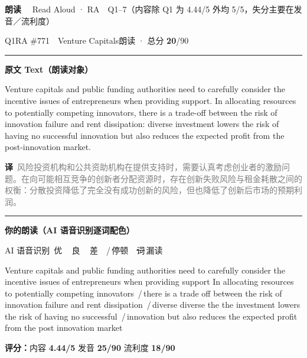 \documentclass[11pt]{article}
\newcommand{\sfull}[1]{\textcolor{cFix}{\bfseries #1}}     %
\newcommand{\spart}[1]{\textcolor{cPartial}{\bfseries #1}} %
\newcommand{\szero}[1]{\textcolor{cWrong}{\bfseries #1}}   %
\newcommand{\ptesub}[1]{%
  \par\needspace{2\baselineskip}\smallskip
  {\color{cAccent}\rule[-0.2ex]{3pt}{1.05em}}\hspace{6pt}%
  {\bfseries\color{cHead}#1}\par\nopagebreak\smallskip}
\newcommand{\ptetask}[2]{%
  \addcontentsline{toc}{subsection}{#1\ #2}%
  \needspace{4\baselineskip}\medskip
  \begin{tcolorbox}[enhanced, colback=cHead, colframe=cHead, sharp corners,
     left=12pt, right=12pt, top=5pt, bottom=5pt, boxrule=0pt]
    {\large\bfseries\color{white} #1}\ \ {\color{white!80} #2}
  \end{tcolorbox}\smallskip}
\newcommand{\sg}[1]{\textcolor{cSpkGood}{#1}}   %
\newcommand{\sy}[1]{\textcolor{cSpkOk}{#1}}     %
\newcommand{\sr}[1]{\textcolor{cSpkBad}{#1}}    %
\newcommand{\pse}{{\color{gray}\,/\,}}          %
\newcommand{\asrlegend}{{\footnotesize\color{gray}AI 语音识别\quad
  {\color{cSpkGood}\textbullet}\,优\ \ {\color{cSpkOk}\textbullet}\,良\ \
  {\color{cSpkBad}\textbullet}\,差\ \ {\color{gray}/}\,停顿\ \
  {\color{cSpkBad}\sout{词}}\,漏读}}
\newcommand{\zh}[1]{{\footnotesize\textcolor{cNote}{\textbf{译}}\ \textcolor{gray}{#1}}}
\begin{document}
\ptetask{朗读}{Read Aloud · RA　Q1--7（内容除 Q1 为 4.44/5 外均 5/5，失分主要在发音／流利度）}
\begin{qblock}{Q1\quad RA \#771\ \ Venture Capitals}{朗读 · 总分 \textcolor{cAccent}{\bfseries 20}/90}
\ptesub{原文 Text（朗读对象）}
\begin{promptbox}
Venture capitals and public funding authorities need to carefully consider the incentive issues of entrepreneurs when providing support. In allocating resources to potentially competing innovators, there is a trade-off between the risk of innovation failure and rent dissipation: diverse investment lowers the risk of having no successful innovation but also reduces the expected profit from the post-innovation market.
\end{promptbox}
\zh{风险投资机构和公共资助机构在提供支持时，需要认真考虑创业者的激励问题。在向可能相互竞争的创新者分配资源时，存在创新失败风险与租金耗散之间的权衡：分散投资降低了完全没有成功创新的风险，但也降低了创新后市场的预期利润。}
\ptesub{你的朗读（AI 语音识别逐词配色）}
\asrlegend
\begin{asrbox}
\sr{Venture} \sr{capitals} \sg{and} \sg{public} \sr{funding} \sg{authorities} \sg{need} \sy{to} \sr{carefully} \sg{consider} \sg{the} \sr{incentive} \sg{issues} \sg{of} \sr{entrepreneurs} \sg{when} \sg{providing} \sg{support} \sg{In} \sr{allocating} \sg{resources} \sy{to} \sr{potentially} \sg{competing} \sr{innovators} \pse \sg{there} \sg{is} \sg{a} \sg{trade} \sy{off} \sg{between} \sg{the} \sy{risk} \sg{of} \sg{innovation} \sr{failure} \sg{and} \sy{rent} \sg{dissipation} \pse \sy{diverse} \sg{diverse} \sg{the} \sg{the} \sr{investment} \sr{lowers} \sg{the} \sy{risk} \sg{of} \sr{having} \sg{no} \sr{successful} \pse \sr{innovation} \sg{but} \sg{also} \sr{reduces} \sg{the} \sr{expected} \sr{profit} \sr{from} \sy{the} \sg{post} \sr{innovation} \sr{market}
\end{asrbox}
\smallskip
{\small\textbf{评分：}内容 \sfull{4.44/5} \quad\textperiodcentered\quad 发音 \spart{25/90} \quad\textperiodcentered\quad 流利度 \szero{18/90}}\quad{\footnotesize\color{gray}（用时 01:10）}
\end{qblock}
\end{document}
